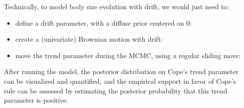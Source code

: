 Technically, to model body size evolution with drift, we would just need to:
\begin{itemize}
\item
define a drift parameter, with a diffuse prior centered on 0:
\\
\item
create a (univariate) Brownian motion with drift:
\\
\item
move the trend parameter during the MCMC, using a regular sliding move:
\\
\end{itemize}
After running the model, the posterior distribution on Cope's trend parameter can be visualized and quantified, and the empirical support in favor of Cope's rule can be assessed by estimating the posterior probability that this trend parameter is positive.

